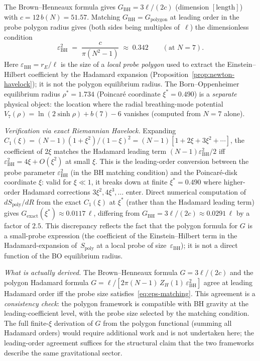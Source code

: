 \begin{remark}
\label{rem:brown-henneaux-check}
The Brown--Henneaux formula gives
$G_{\mathrm{BH}} = 3\ell/(2c)$ (dimension $[\text{length}]$)
with $c = 12\,b(N) = 51.57$.
Matching $G_{\mathrm{BH}} = G_{\mathrm{polygon}}$ at leading
order in the probe polygon radius gives (both sides being
multiples of~$\ell$) the dimensionless condition
\begin{equation}\label{eq:eps-matching}
  \varepsilon_{\mathrm{BH}}^2
  \;=\; \frac{c}{\pi(N^2{-}1)} \;\approx\; 0.342
  \qquad (\text{at } N = 7).
\end{equation}
Here $\varepsilon_{\mathrm{BH}} = r_E/\ell$ is the size of a
\emph{local probe polygon} used to extract the
Einstein--Hilbert coefficient by the Hadamard expansion
(Proposition~\ref{prop:newton-havelock}); it is not the
polygon equilibrium radius.  The Born--Oppenheimer
equilibrium radius $\rho^* = 1.734$ (Poincar\'e coordinate
$\xi^* = 0.490$) is a \emph{separate} physical object:
the location where the radial breathing-mode potential
$V_7(\rho) = \ln(2\sinh\rho) + b(7) - 6$ vanishes
(computed from $N = 7$ alone).

\emph{Verification via exact Riemannian Havelock.}  Expanding
$C_1(\xi) = (N{-}1)(1+\xi^2)/(1-\xi)^2 = (N{-}1)[1 + 2\xi + 3\xi^2 + \cdots]$,
the coefficient of $2\xi$ matches the Hadamard leading
term $(N{-}1)\varepsilon_{\mathrm{BH}}^2/2$ iff
$\varepsilon_{\mathrm{BH}}^2 = 4\xi + O(\xi^2)$ at small $\xi$.
This is the leading-order conversion between the probe
parameter $\varepsilon_{\mathrm{BH}}^2$ (in the BH
matching condition) and the Poincar\'e-disk coordinate
$\xi$: valid for $\xi \ll 1$, it breaks down at finite
$\xi^* = 0.490$ where higher-order Hadamard corrections
$3\xi^2, 4\xi^3, \ldots$ enter.  Direct numerical
computation of $dS_{\mathrm{poly}}/dR$ from the exact
$C_1(\xi)$ at $\xi^*$ (rather than the Hadamard leading
term) gives $G_{\mathrm{exact}}(\xi^*) \approx 0.0117\,\ell$,
differing from $G_{\mathrm{BH}} = 3\ell/(2c) \approx
0.0291\,\ell$ by a factor of $2.5$.  This discrepancy
reflects the fact that the polygon formula for $G$ is a
small-probe expression (the coefficient of the
Einstein--Hilbert term in the
Hadamard-expansion of~$S_{\mathrm{poly}}$ at a local
probe of size~$\varepsilon_{\mathrm{BH}}$); it is not a
direct function of the BO equilibrium radius.

\emph{What is actually derived.}  The Brown--Henneaux
formula $G = 3\ell/(2c)$ and the polygon Hadamard formula
$G = \ell/[2\pi(N{-}1)\,Z_H(1)\,\varepsilon_{\mathrm{BH}}^2]$
agree at leading Hadamard order iff the probe size
satisfies~\eqref{eq:eps-matching}.  This agreement is a
\emph{consistency check}: the polygon framework is
compatible with BH gravity at the leading-coefficient
level, with the probe size selected by the matching
condition.  The full finite-$\xi$ derivation of $G$
from the polygon functional (summing all Hadamard
orders) would require additional work and is not
undertaken here; the leading-order agreement suffices
for the structural claim that the two frameworks
describe the same gravitational sector.
\end{remark}

